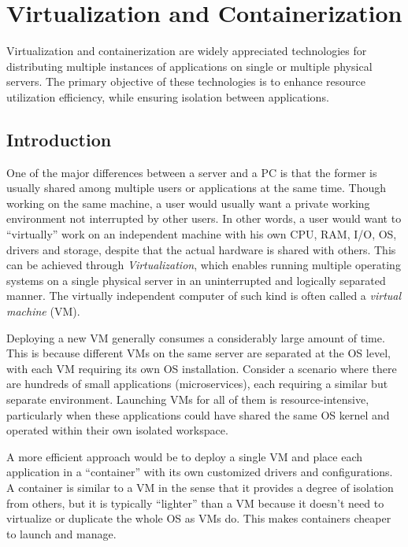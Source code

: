 \chapter{Virtualization and Containerization} \label{ch:vac}

Virtualization and containerization are widely appreciated technologies for distributing multiple instances of applications on single or multiple physical servers. The primary objective of these technologies is to enhance resource utilization efficiency, while ensuring isolation between applications.

\section{Introduction}

One of the major differences between a server and a PC is that the former is usually shared among multiple users or applications at the same time. Though working on the same machine, a user would usually want a private working environment not interrupted by other users. In other words, a user would want to ``virtually'' work on an independent machine with his own CPU, RAM, I/O, OS, drivers and storage, despite that the actual hardware is shared with others. This can be achieved through \textit{Virtualization}, which enables running multiple operating systems on a single physical server in an uninterrupted and logically separated manner. The virtually independent computer of such kind is often called a \textit{virtual machine} (VM).

Deploying a new VM generally consumes a considerably large amount of time. This is because different VMs on the same server are separated at the OS level, with each VM requiring its own OS installation. Consider a scenario where there are hundreds of small applications (microservices), each requiring a similar but separate environment. Launching VMs for all of them is resource-intensive, particularly when these applications could have shared the same OS kernel and operated within their own isolated workspace.

A more efficient approach would be to deploy a single VM and place each application in a ``container'' with its own customized drivers and configurations. A container is similar to a VM in the sense that it provides a degree of isolation from others, but it is typically ``lighter'' than a VM because it doesn't need to virtualize or duplicate the whole OS as VMs do. This makes containers cheaper to launch and manage.

